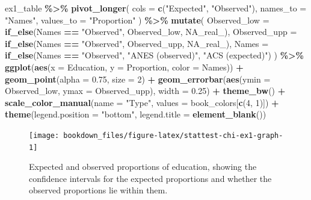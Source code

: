 \documentclass[
]{krantz}
\makeatletter
\newenvironment{Shaded}{\begin{snugshade}}{\end{snugshade}}
\newcommand{\AttributeTok}[1]{\textcolor[rgb]{0.27,0.27,0.27}{#1}}
\newcommand{\ConstantTok}[1]{\textcolor[rgb]{0.37,0.37,0.37}{#1}}
\newcommand{\DecValTok}[1]{\textcolor[rgb]{0.06,0.06,0.06}{#1}}
\newcommand{\FloatTok}[1]{\textcolor[rgb]{0.06,0.06,0.06}{#1}}
\newcommand{\FunctionTok}[1]{\textcolor[rgb]{0.27,0.27,0.27}{\textbf{#1}}}
\newcommand{\NormalTok}[1]{#1}
\newcommand{\SpecialCharTok}[1]{\textcolor[rgb]{0.43,0.43,0.43}{\textbf{#1}}}
\newcommand{\StringTok}[1]{\textcolor[rgb]{0.5,0.5,0.5}{#1}}
\newenvironment{kframe}{%
\medskip{}
\setlength{\fboxsep}{.8em}
 \def\at@end@of@kframe{}%
 \ifinner\ifhmode%
  \def\at@end@of@kframe{\end{minipage}}%
  \begin{minipage}{\columnwidth}%
 \fi\fi%
 \def\FrameCommand##1{\hskip\@totalleftmargin \hskip-\fboxsep
 \colorbox{shadecolor}{##1}\hskip-\fboxsep
     \hskip-\linewidth \hskip-\@totalleftmargin \hskip\columnwidth}%
 \MakeFramed {\advance\hsize-\width
   \@totalleftmargin\z@ \linewidth\hsize
   \@setminipage}}%
 {\par\unskip\endMakeFramed%
 \at@end@of@kframe}
\renewenvironment{Shaded}{\begin{kframe}}{\end{kframe}}
\makeatother
\begin{document}
\begin{Shaded}
\begin{Highlighting}[]
\NormalTok{ex1\_table }\SpecialCharTok{\%\textgreater{}\%}
  \FunctionTok{pivot\_longer}\NormalTok{(}
    \AttributeTok{cols =} \FunctionTok{c}\NormalTok{(}\StringTok{"Expected"}\NormalTok{, }\StringTok{"Observed"}\NormalTok{),}
    \AttributeTok{names\_to =} \StringTok{"Names"}\NormalTok{,}
    \AttributeTok{values\_to =} \StringTok{"Proportion"}
\NormalTok{  ) }\SpecialCharTok{\%\textgreater{}\%}
  \FunctionTok{mutate}\NormalTok{(}
    \AttributeTok{Observed\_low =} \FunctionTok{if\_else}\NormalTok{(Names }\SpecialCharTok{==} \StringTok{"Observed"}\NormalTok{, Observed\_low, }\ConstantTok{NA\_real\_}\NormalTok{),}
    \AttributeTok{Observed\_upp =} \FunctionTok{if\_else}\NormalTok{(Names }\SpecialCharTok{==} \StringTok{"Observed"}\NormalTok{, Observed\_upp, }\ConstantTok{NA\_real\_}\NormalTok{),}
    \AttributeTok{Names =} \FunctionTok{if\_else}\NormalTok{(Names }\SpecialCharTok{==} \StringTok{"Observed"}\NormalTok{, }\StringTok{"ANES (observed)"}\NormalTok{, }\StringTok{"ACS (expected)"}\NormalTok{)}
\NormalTok{  ) }\SpecialCharTok{\%\textgreater{}\%}
  \FunctionTok{ggplot}\NormalTok{(}\FunctionTok{aes}\NormalTok{(}\AttributeTok{x =}\NormalTok{ Education, }\AttributeTok{y =}\NormalTok{ Proportion, }\AttributeTok{color =}\NormalTok{ Names)) }\SpecialCharTok{+}
  \FunctionTok{geom\_point}\NormalTok{(}\AttributeTok{alpha =} \FloatTok{0.75}\NormalTok{, }\AttributeTok{size =} \DecValTok{2}\NormalTok{) }\SpecialCharTok{+}
  \FunctionTok{geom\_errorbar}\NormalTok{(}\FunctionTok{aes}\NormalTok{(}\AttributeTok{ymin =}\NormalTok{ Observed\_low, }\AttributeTok{ymax =}\NormalTok{ Observed\_upp), }\AttributeTok{width =} \FloatTok{0.25}\NormalTok{) }\SpecialCharTok{+}
  \FunctionTok{theme\_bw}\NormalTok{() }\SpecialCharTok{+}
  \FunctionTok{scale\_color\_manual}\NormalTok{(}\AttributeTok{name =} \StringTok{"Type"}\NormalTok{, }\AttributeTok{values =}\NormalTok{ book\_colors[}\FunctionTok{c}\NormalTok{(}\DecValTok{4}\NormalTok{, }\DecValTok{1}\NormalTok{)]) }\SpecialCharTok{+}
  \FunctionTok{theme}\NormalTok{(}\AttributeTok{legend.position =} \StringTok{"bottom"}\NormalTok{, }\AttributeTok{legend.title =} \FunctionTok{element\_blank}\NormalTok{())}
\end{Highlighting}
\end{Shaded}

\begin{figure}
\texttt{[image: bookdown\_files/figure-latex/stattest-chi-ex1-graph-1]} \caption{Expected and observed proportions of education, showing the confidence intervals for the expected proportions and whether the observed proportions lie within them.}\label{fig:stattest-chi-ex1-graph}
\end{figure}
\end{document}
